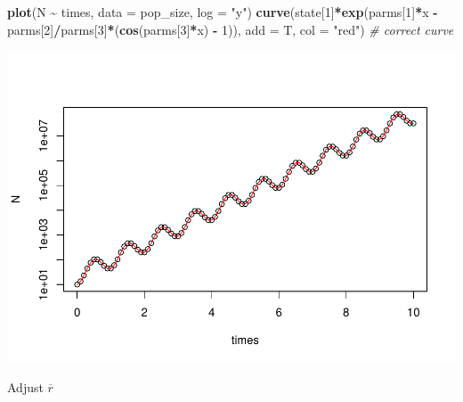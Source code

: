 \documentclass[
]{book}
\newenvironment{Shaded}{\begin{snugshade}}{\end{snugshade}}
\newcommand{\AttributeTok}[1]{\textcolor[rgb]{0.13,0.29,0.53}{#1}}
\newcommand{\CommentTok}[1]{\textcolor[rgb]{0.56,0.35,0.01}{\textit{#1}}}
\newcommand{\DecValTok}[1]{\textcolor[rgb]{0.00,0.00,0.81}{#1}}
\newcommand{\FunctionTok}[1]{\textcolor[rgb]{0.13,0.29,0.53}{\textbf{#1}}}
\newcommand{\NormalTok}[1]{#1}
\newcommand{\SpecialCharTok}[1]{\textcolor[rgb]{0.81,0.36,0.00}{\textbf{#1}}}
\newcommand{\StringTok}[1]{\textcolor[rgb]{0.31,0.60,0.02}{#1}}
\begin{document}
\begin{Shaded}
\begin{Highlighting}[]
\FunctionTok{plot}\NormalTok{(N }\SpecialCharTok{\textasciitilde{}}\NormalTok{ times, }\AttributeTok{data =}\NormalTok{ pop\_size, }\AttributeTok{log =} \StringTok{"y"}\NormalTok{)}
\FunctionTok{curve}\NormalTok{(state[}\DecValTok{1}\NormalTok{]}\SpecialCharTok{*}\FunctionTok{exp}\NormalTok{(parms[}\DecValTok{1}\NormalTok{]}\SpecialCharTok{*}\NormalTok{x }\SpecialCharTok{{-}}\NormalTok{ parms[}\DecValTok{2}\NormalTok{]}\SpecialCharTok{/}\NormalTok{parms[}\DecValTok{3}\NormalTok{]}\SpecialCharTok{*}\NormalTok{(}\FunctionTok{cos}\NormalTok{(parms[}\DecValTok{3}\NormalTok{]}\SpecialCharTok{*}\NormalTok{x) }\SpecialCharTok{{-}} \DecValTok{1}\NormalTok{)), }\AttributeTok{add =}\NormalTok{ T, }\AttributeTok{col =} \StringTok{"red"}\NormalTok{) }\CommentTok{\# correct curve}
\end{Highlighting}
\end{Shaded}

\includegraphics{bookdown-demo_files/figure-latex/unnamed-chunk-11-2.pdf}

Adjust \(\overline{r}\)
\end{document}
